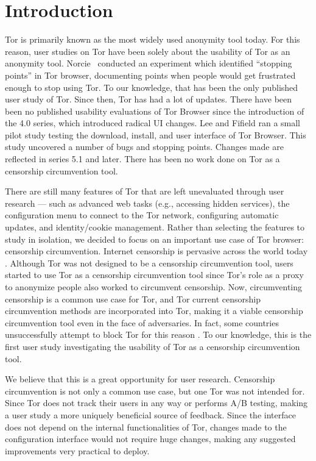 \documentclass{template}
\begin{document}
\section{Introduction}
Tor is primarily known as the most widely used anonymity tool today. 
For this reason, user studies on Tor have been solely about the usability of Tor as an
anonymity tool. Norcie~\cite{norcie2012eliminating} conducted an experiment which identified 
``stopping points'' in Tor browser,  documenting points when people would get frustrated enough 
to stop using Tor. To our knowledge, that has been the only published user study of Tor. 
Since then, Tor has had a lot of updates. There have been been no published usability evaluations of
Tor Browser since the introduction of the 4.0 series, which introduced radical UI changes. 
Lee and Fifield \cite {uxsprint} ran a small pilot study testing the download, install, and user interface of Tor Browser. 
This study uncovered a number of bugs and stopping points. Changes made are reflected in series 
5.1 and later. There has been no work done on Tor as a censorship circumvention tool. 

There are still many features of Tor that are left unevaluated through user
research --- such as advanced web tasks (e.g., accessing hidden services), the
configuration menu to connect to the Tor network, configuring automatic
updates, and identity/cookie management. Rather than selecting the features to
study in isolation, we decided to focus on an important use case of Tor browser: censorship circumvention. 
Internet censorship is pervasive across the world today \cite{faris2008measuring}. 
Although Tor was not designed to be a censorship circumvention tool, users started
to use Tor as a censorship circumvention tool since Tor's role as a proxy to anonymize
people also worked to circumvent censorship. Now, circumventing censorship is a
common use case for Tor, and Tor current censorship circumvention methods are
incorporated into Tor, making it a viable censorship circumvention tool even in the face
of adversaries. In fact, some countries unsuccessfully attempt to block Tor for this reason \cite{winter2012great}. 
To our knowledge, this is the first user study investigating the usability of Tor as a 
censorship circumvention tool.

We believe that this is a great opportunity for user research. Censorship circumvention
is not only a common use case, but one Tor was not intended for. Since Tor does not 
track their users in any way or performs A/B testing, making a user study a more
uniquely beneficial source of feedback. Since the interface does not depend on the 
internal functionalities of Tor, changes made to the configuration interface would not 
require huge changes, making any suggested improvements very practical to 
deploy. 
\end{document}
